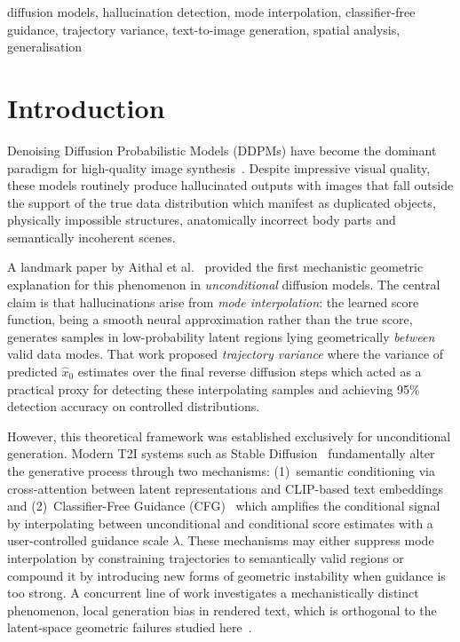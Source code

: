 \documentclass[conference]{IEEEtran}
\begin{document}
\begin{IEEEkeywords}
diffusion models, hallucination detection, mode interpolation,
classifier-free guidance, trajectory variance, text-to-image
generation, spatial analysis, generalisation
\end{IEEEkeywords}

\section{Introduction}
\label{sec:introduction}

Denoising Diffusion Probabilistic Models (DDPMs) have become the
dominant paradigm for high-quality image synthesis~\cite{ho2020ddpm,
song2020ddim}. Despite impressive visual quality, these models
routinely produce hallucinated outputs with images that fall outside
the support of the true data distribution which manifest as duplicated
objects, physically impossible structures, anatomically incorrect
body parts and semantically incoherent scenes.

A landmark paper by Aithal et al.~\cite{yi2024understanding} provided
the first mechanistic geometric explanation for this phenomenon in
\emph{unconditional} diffusion models. The central claim is that
hallucinations arise from \emph{mode interpolation}: the learned
score function, being a smooth neural approximation rather than the
true score, generates samples in low-probability latent regions lying
geometrically \emph{between} valid data modes. That work proposed
\emph{trajectory variance} where the variance of predicted $\hat{x}_0$
estimates over the final reverse diffusion steps which acted as a practical
proxy for detecting these interpolating samples and achieving 95\%
detection accuracy on controlled distributions.

However, this theoretical framework was established exclusively for
unconditional generation. Modern T2I systems such as Stable
Diffusion~\cite{rombach2022ldm} fundamentally alter the generative
process through two mechanisms: (1)~semantic conditioning via
cross-attention between latent representations and CLIP-based text
embeddings~\cite{radford2021clip} and (2)~Classifier-Free
Guidance (CFG)~\cite{ho2022cfg} which amplifies the conditional
signal by interpolating between unconditional and conditional score
estimates with a user-controlled guidance scale $\lambda$. These
mechanisms may either suppress mode interpolation by constraining
trajectories to semantically valid regions or compound it by
introducing new forms of geometric instability when guidance is
too strong. A concurrent line of work investigates a mechanistically
distinct phenomenon, local generation bias in rendered text, which
is orthogonal to the latent-space geometric failures studied
here~\cite{liu2024texthallu}.
\end{document}
